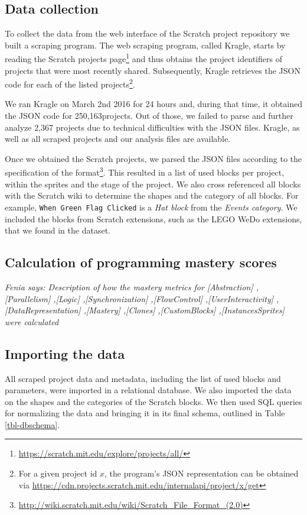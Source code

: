 \documentclass[10pt, conference]{IEEEtran}
\newcommand{\nPrograms}{250,163}
\newcommand{\fenia}[1]{\emph{\color{blue}Fenia says: #1}}
\begin{document}
\subsection{Data collection}
To collect the data from the web interface of the Scratch project repository we built a scraping program.
The web scraping program, called Kragle, starts by reading the Scratch projects page\footnote{\label{scratchpublic}\url{https://scratch.mit.edu/explore/projects/all/}} and thus obtains the project identifiers of projects that were most recently shared.
Subsequently, Kragle retrieves the JSON code for each of the listed projects\footnote{For a given project id $x$, the program's JSON representation can be obtained via \url{https://cdn.projects.scratch.mit.edu/internalapi/project/x/get}}.

We ran Kragle on March 2nd 2016 for 24 hours and, during that time, it obtained the JSON code for \nPrograms projects. Out of those, we failed to parse and further analyze 2,367 projects due to technical difficulties with the JSON files.
Kragle, as well as all scraped projects and our analysis files are available.\footnotemark[\ref{dataseturl}]

Once we obtained the Scratch projects, we parsed the JSON files according to the specification of the format\footnote{\url{http://wiki.scratch.mit.edu/wiki/Scratch_File_Format_(2.0)}}.
This resulted in a list of used blocks per project, within the sprites and the stage of the project.
We also cross referenced all blocks with the Scratch wiki to determine the shapes and the category of all blocks.
For example, \texttt{When Green Flag Clicked} is a \emph{Hat block} from the \emph{Events category}.
We included the blocks from Scratch extensions, such as the LEGO WeDo extensions, that we found in the dataset.

\subsection{Calculation of programming mastery scores}
\fenia{Description of how the mastery metrics for       
	[Abstraction]
	,[Parallelism]
	,[Logic]
	,[Synchronization]
	,[FlowControl]
	,[UserInteractivity]
	,[DataRepresentation]
	,[Mastery]
	,[Clones]
	,[CustomBlocks]
	,[InstancesSprites]
	were calculated}

\subsection{Importing the data}
\label{dataAnalysis}
All scraped project data and metadata, including the list of used blocks and parameters, were imported in a relational database.
We also imported the data on the shapes and the categories of the Scratch blocks.
We then used SQL queries for normalizing the data and bringing it in its final schema, outlined in Table \ref{tbl-dbschema}.
\end{document}
